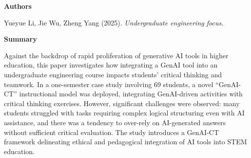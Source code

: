 \documentclass[11pt, a4paper]{article}
\newenvironment{annotation}[1]
{\par\vspace{2pt}\noindent\textbf{#1}\par\vspace{1pt}\noindent\small\ignorespaces}
{\par\vspace{3pt}}
\begin{document}
\begin{annotation}{Authors}
Yueyue Li, Jie Wu, Zheng Yang (2025). \textit{Undergraduate engineering focus.}
\end{annotation}

\begin{annotation}{Summary}
Against the backdrop of rapid proliferation of generative AI tools in higher education, this paper investigates how integrating a GenAI tool into an undergraduate engineering course impacts students' critical thinking and teamwork. In a one-semester case study involving 69 students, a novel ``GenAI-CT'' instructional model was deployed, integrating GenAI-driven activities with critical thinking exercises. However, significant challenges were observed: many students struggled with tasks requiring complex logical structuring even with AI assistance, and there was a tendency to over-rely on AI-generated answers without sufficient critical evaluation. The study introduces a GenAI-CT framework delineating ethical and pedagogical integration of AI tools into STEM education.
\end{annotation}
\end{document}
